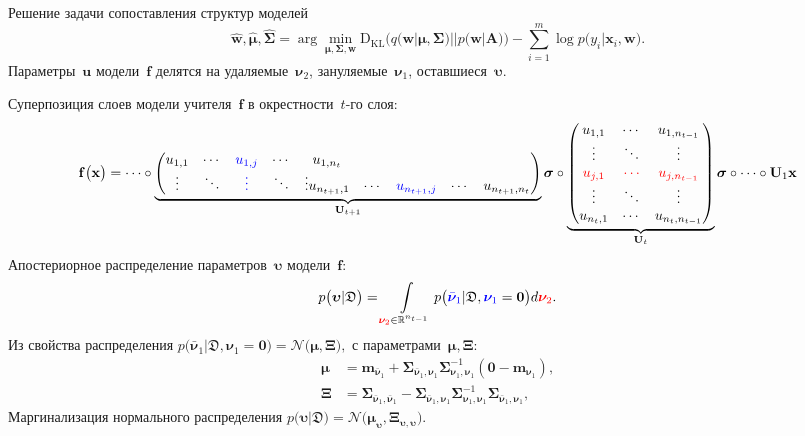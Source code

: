 \documentclass[10pt,pdf,hyperref={unicode}]{beamer}
\begin{document}
\begin{frame}{Решение задачи сопоставления структур моделей}\vspace{-.4cm}
\[
\hat{\mathbf{w}}, \hat{\bm{\mu}}, \hat{\bm{\Sigma}} = \arg \min_{\bm{\mu}, \bm{\Sigma}, \mathbf{w}} \text{D}_{\text{KL}}\bigr(q\bigr(\mathbf{w}|\bm{\mu}, \bm{\Sigma}\bigr)||p\bigr(\mathbf{w}|\mathbf{A}\bigr)\bigr) - \sum_{i=1}^{m}\log p\bigr(y_i|\mathbf{x}_{i}, \mathbf{w}\bigr).
\]
Параметры~$\mathbf{u}$ модели~$\mathbf{f}$ делятся на {\color{red} удаляемые~$\bm{\nu}_2$}, {\color{blue} зануляемые~$\bm{\nu}_1$}, {оставшиеся~$\bm{\upsilon}$}.

Суперпозиция слоев модели учителя~$\mathbf{f}$ в окрестности~$t$-го слоя:
{\small\[
\setlength\abovedisplayskip{0pt}
\mathbf{f}\bigr(\mathbf{x}\bigr) = \cdots \circ
\underbrace{
\begin{pmatrix}
u_{1,1} & \cdots & {\color{blue} u_{1,j}} & \cdots & u_{1,n_{t}} \\
\vdots  & \ddots & {\color{blue} \vdots}  & \ddots & \vdots 
u_{n_{t+1},1} & \cdots & {\color{blue} u_{n_{t+1},j}} & \cdots & u_{n_{t+1},n_{t}} \\
\end{pmatrix} 
}_{\mathbf{U}_{t+1}}
\bm{\sigma} 
\circ 
\underbrace{
\begin{pmatrix}
u_{1,1} & \cdots & u_{1,n_{t-1}} \\
\vdots  & \ddots & \vdots        \\
{\color{red} u_{j,1}} & {\color{red}\cdots} & {\color{red} u_{j,n_{t-1}}} \\
\vdots  & \ddots & \vdots        \\
u_{n_{t},1} & \cdots & u_{n_{t},n_{t-1}} \\
\end{pmatrix}
}_{\mathbf{U}_{t}}
\bm{\sigma}
\circ 
\cdots
\circ 
\mathbf{U}_1
\mathbf{x}
\setlength\belowdisplayskip{0pt}
\]}
Апостериорное распределение параметров~$\bm{\upsilon}$ модели~$\mathbf{f}$:
\[
\setlength\abovedisplayskip{0pt}
p\bigr(\bm{\upsilon}|\mathfrak{D}\bigr)  = \int\limits_{{\color{red} \bm{\nu}_2} \in \mathbb{R}^{n_{t-1}}}p\bigr({\color{blue}\bar{\bm{\nu}}_1}|\mathfrak{D}, {\color{blue}\bm{\nu}_1}=\mathbf{0}\bigr) d{\color{red} \bm{\nu}_2}.
\setlength\belowdisplayskip{0pt}
\]
Из свойства распределения 
$
    p\bigr(\bar{\bm{\nu}}_1|\mathfrak{D}, \bm{\nu}_1=\mathbf{0}\bigr) = \mathcal{N}\bigr(\bm{\mu}, \bm{\Xi}\bigr),
$
с параметрами~$\bm{\mu}, \bm{\Xi}$:
\[
\begin{aligned}
\bm{\mu} &= \mathbf{m}_{\bar{\bm{\nu}}_1}+\bm{\Sigma}_{\bar{\bm{\nu}}_1,\bm{\nu}_1} \bm{\Sigma}_{\bm{\nu}_1,\bm{\nu}_1}^{-1} \left(\mathbf{0} - \mathbf{m}_{\bm{\nu}_1}\right), \\
 \bm{\Xi} &= \bm{\Sigma}_{\bar{\bm{\nu}}_1,\bar{\bm{\nu}}_1} - \bm{\Sigma}_{\bar{\bm{\nu}}_1,\bm{\nu}_1} \bm{\Sigma}_{\bm{\nu}_1,\bm{\nu}_1}^{-1} \bm{\Sigma}_{\bar{\bm{\nu}}_1,\bm{\nu}_1},
\end{aligned}
\]
Маргинализация нормального распределения
$
p\bigr(\bm{\upsilon}|\mathfrak{D}\bigr) = \mathcal{N}\bigr(\bm{\mu}_{\bm{\upsilon}},  \bm{\Xi}_{\bm{\upsilon}, \bm{\upsilon}}\bigr).
$
\end{frame}
\end{document}
